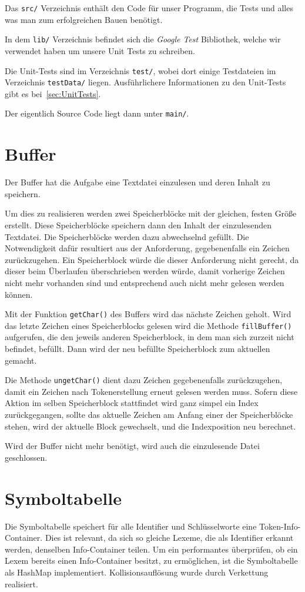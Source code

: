 Das \texttt{src/} Verzeichnis enthält den Code für unser Programm, die Tests und alles was man zum erfolgreichen Bauen benötigt.

In dem \texttt{lib/} Verzeichnis befindet sich die \textit{Google Test} Bibliothek, welche wir verwendet haben um unsere Unit Tests zu schreiben.

Die Unit-Tests sind im Verzeichnis \texttt{test/}, wobei dort einige Testdateien im Verzeichnis \texttt{testData/} liegen. Ausführlichere Informationen zu den Unit-Tests gibt es bei~\ref{sec:UnitTests}.

Der eigentlich Source Code liegt dann unter \texttt{main/}.

\section{Buffer}
Der Buffer hat die Aufgabe eine Textdatei einzulesen und deren Inhalt zu speichern.

Um dies zu realisieren werden zwei Speicherblöcke mit der gleichen, festen Größe erstellt. Diese Speicherblöcke speichern dann den Inhalt der einzulesenden Textdatei. Die Speicherblöcke werden dazu abwechselnd gefüllt. Die Notwendigkeit dafür resultiert aus der Anforderung, gegebenenfalls ein Zeichen zurückzugehen. Ein Speicherblock würde die dieser Anforderung nicht gerecht, da dieser beim Überlaufen überschrieben werden würde, damit vorherige Zeichen nicht mehr vorhanden sind und entsprechend auch nicht mehr gelesen werden können.

Mit der Funktion \texttt{getChar()} des Buffers wird das nächste Zeichen geholt. Wird das letzte Zeichen eines Speicherblocks gelesen wird die Methode \texttt{fillBuffer()} aufgerufen, die den jeweils anderen Speicherblock, in dem man sich zurzeit nicht befindet, befüllt. Dann wird der neu befüllte Speicherblock zum aktuellen gemacht.

Die Methode \texttt{ungetChar()} dient dazu Zeichen gegebenenfalls zurückzugehen, damit ein Zeichen nach Tokenerstellung erneut gelesen werden muss. Sofern diese Aktion im selben Speicherblock stattfindet wird ganz simpel ein Index zurückgegangen, sollte das aktuelle Zeichen am Anfang einer der Speicherblöcke stehen, wird der aktuelle Block gewechselt, und die Indexposition neu berechnet.

Wird der Buffer nicht mehr benötigt, wird auch die einzulesende Datei geschlossen.

\section{Symboltabelle}
Die Symboltabelle speichert für alle Identifier und Schlüsselworte eine Token-Info-Container. Dies ist relevant, da sich so gleiche Lexeme, die als Identifier erkannt werden, denselben Info-Container teilen. Um ein performantes überprüfen, ob ein Lexem bereits einen Info-Container besitzt, zu ermöglichen, ist die Symboltabelle als HashMap implementiert. Kollisionsauflösung wurde durch Verkettung realisiert.


